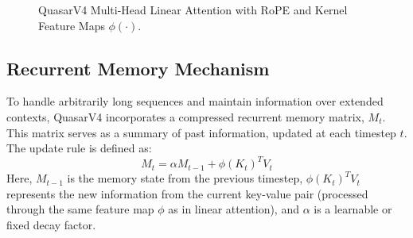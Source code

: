 \documentclass{article}
\begin{document}
\begin{figure}[htbp]
{
    }
    \caption{QuasarV4 Multi-Head Linear Attention with RoPE and Kernel Feature Maps $\phi(\cdot)$.}
    \label{fig:quasar_mha_kernel}
\end{figure}


\subsection{Recurrent Memory Mechanism}
\label{sec:recurrent_memory}
To handle arbitrarily long sequences and maintain information over extended contexts, QuasarV4 incorporates a compressed recurrent memory matrix, $M_t$. This matrix serves as a summary of past information, updated at each timestep $t$. The update rule is defined as:
\begin{equation}
M_t = \alpha M_{t-1} + \phi(K_t)^T V_t
\label{eq:memory_update}
\end{equation}
Here, $M_{t-1}$ is the memory state from the previous timestep, $\phi(K_t)^T V_t$ represents the new information from the current key-value pair (processed through the same feature map $\phi$ as in linear attention), and $\alpha$ is a learnable or fixed decay factor.
\end{document}
